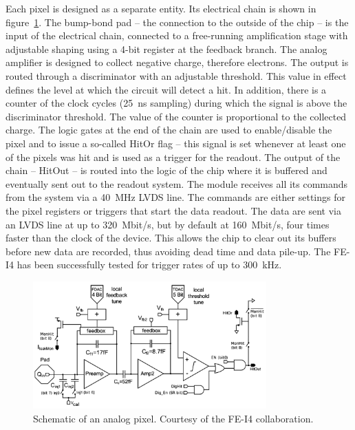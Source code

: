Each pixel is designed as a separate entity. Its electrical chain is shown in figure~\ref{fig:anapix}. The bump-bond pad -- the connection to the outside of the chip -- is the input of the electrical chain, connected to a free-running amplification stage with adjustable shaping using a 4-bit register at the feedback branch. The analog amplifier is designed to collect negative charge, therefore electrons. The output is routed through a discriminator with an adjustable threshold. This value in effect defines the level at which the circuit will detect a hit. In addition, there is a counter of the clock cycles (25~ns sampling) during which the signal is above the discriminator threshold. The value of the counter is proportional to the collected charge. The logic gates at the end of the chain are used to enable/disable the pixel and to issue a so-called HitOr flag -- this signal is set whenever at least one of the pixels was hit and is used as a trigger for the readout. The output of the chain -- HitOut -- is routed into the logic of the chip where it is buffered and eventually sent out to the readout system. The module receives all its commands from the system via a 40~MHz LVDS line. The commands are either settings for the pixel registers or triggers that start the data readout. The data are sent via an LVDS line at up to 320~Mbit/s, but by default at 160~Mbit/s, four times faster than the clock of the device. This allows the chip to clear out its buffers before new data are recorded, thus avoiding dead time and data pile-up. The FE-I4 has been successfully tested for trigger rates of up to 300~kHz. 

\begin{figure}[!t]
\centering
\includegraphics[width=0.8\textwidth]{04_charge_monitoring/pics/analogPix}
\caption{Schematic of an analog pixel. Courtesy of the FE-I4 collaboration.}
\label{fig:anapix}
\end{figure}

